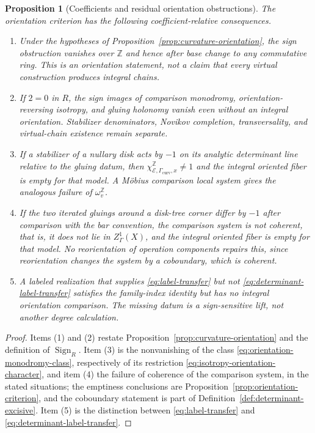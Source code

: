\documentclass[11pt,letterpaper,twoside]{article}
\theoremstyle{plain}
\newtheorem{proposition}[theorem]{Proposition}
\theoremstyle{definition}
\theoremstyle{remark}
\begin{document}
\begin{proposition}[Coefficients and residual orientation obstructions]\label{prop:curvature-orientation-coefficients}
The orientation criterion has the following coefficient-relative consequences.
\begin{enumerate}
\item Under the hypotheses of Proposition~\ref{prop:curvature-orientation}, the sign obstruction vanishes over $\mathbb Z$ and hence after base change to any commutative ring.  This is an orientation statement, not a claim that every virtual construction produces integral chains.
\item If $2=0$ in $R$, the sign images of comparison monodromy, orientation-reversing isotropy, and gluing holonomy vanish even without an integral orientation.  Stabilizer denominators, Novikov completion, transversality, and virtual-chain existence remain separate.
\item If a stabilizer of a nullary disk acts by $-1$ on its analytic determinant line relative to the gluing datum, then \(\chi^{\mathbb Z}_{\mathcal E,\Gamma_{\mathrm{curv}},x}\neq1\) and the integral oriented fiber is empty for that model.  A M\"obius comparison local system gives the analogous failure of \(\omega^{\mathbb Z}_v\).
\item If the two iterated gluings around a disk-tree corner differ by $-1$ after comparison with the bar convention, the comparison system is not coherent, that is, it does not lie in \(Z^1_\Gamma(X)\), and the integral oriented fiber is empty for that model.  No reorientation of operation components repairs this, since reorientation changes the system by a coboundary, which is coherent.
\item A labeled realization that supplies \eqref{eq:label-transfer} but not \eqref{eq:determinant-label-transfer} satisfies the family-index identity but has no integral orientation comparison.  The missing datum is a sign-sensitive lift, not another degree calculation.
\end{enumerate}
\end{proposition}

\begin{proof}
Items (1) and (2) restate Proposition~\ref{prop:curvature-orientation} and the definition of \(\operatorname{Sign}_R\).  Item (3) is the nonvanishing of the class \eqref{eq:orientation-monodromy-class}, respectively of its restriction \eqref{eq:isotropy-orientation-character}, and item (4) the failure of coherence of the comparison system, in the stated situations; the emptiness conclusions are Proposition~\ref{prop:orientation-criterion}, and the coboundary statement is part of Definition~\ref{def:determinant-excisive}.  Item (5) is the distinction between \eqref{eq:label-transfer} and \eqref{eq:determinant-label-transfer}.
\end{proof}
\end{document}
